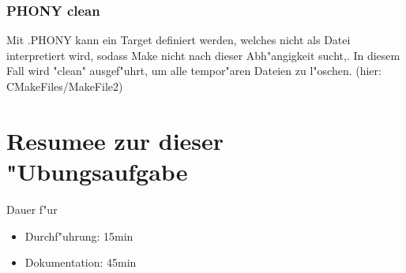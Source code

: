 \documentclass[a4paper,11pt,titlepage]{article}
\begin{document}
    \subsubsection{PHONY clean}
    Mit .PHONY kann ein Target definiert werden, welches nicht als Datei interpretiert wird, sodass Make nicht nach dieser Abh"angigkeit sucht,. In diesem Fall wird "clean" ausgef"uhrt, um alle tempor"aren Dateien zu l"oschen. (hier: CMakeFiles/MakeFile2) \\


    \section{Resumee zur dieser "Ubungsaufgabe}
    Dauer f"ur
    \begin{itemize}
        \item Durchf"uhrung: 15min
        \item Dokumentation: 45min
    \end{itemize}
\end{document}
